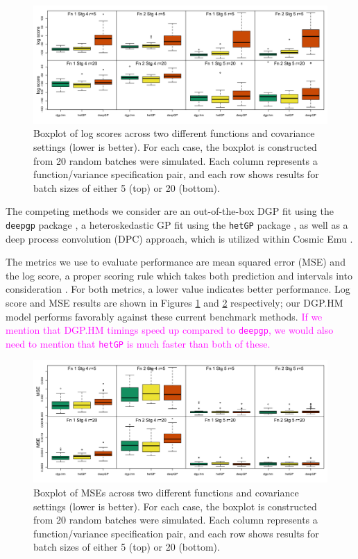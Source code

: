 \documentclass[11pt]{article}
\begin{document}
\begin{figure}[t]
    \centering
    \includegraphics[width=6in]{sims_logS.png}
    \caption{Boxplot of log scores across two different functions and covariance settings (lower is better). For each case, the boxplot is constructed from 20 random batches were simulated. Each column represents a function/variance specification pair, and each row shows results for batch sizes of either 5 (top) or 20 (bottom).}
    \label{fig:sims_logS}
\end{figure}

The competing methods we consider are an out-of-the-box DGP fit using the \texttt{deepgp} package \citep{sauer2023active}, a heteroskedastic GP fit using the \texttt{hetGP} package \citep{binois2018practical, binois2021hetgp}, as well as a deep process convolution (DPC) approach, which is utilized within Cosmic Emu \citep{moran2023mira}. 

The metrics we use to evaluate performance are mean squared error (MSE) and the log score, a proper scoring rule which takes both prediction and intervals into consideration \citep{gneiting2007strictly}. For both metrics, a lower value indicates better performance. Log score and MSE results are shown in Figures \ref{fig:sims_logS} and \ref{fig:sims_MSE} respectively; our DGP.HM model performs favorably against these current benchmark methods. \textcolor{magenta}{If we mention that DGP.HM timings speed up compared to \texttt{deepgp}, we would also need to mention that \texttt{hetGP} is much faster than both of these.}

\begin{figure}
    \centering
    \includegraphics[width=6in]{sims_MSE.png}
    \caption{Boxplot of MSEs across two different functions and covariance settings (lower is better). For each case, the boxplot is constructed from 20 random batches were simulated. Each column represents a function/variance specification pair, and each row shows results for batch sizes of either 5 (top) or 20 (bottom).}    
    \label{fig:sims_MSE}
\end{figure}
\end{document}
